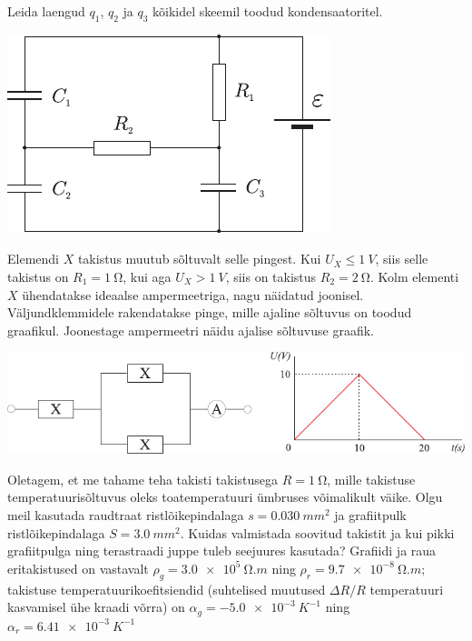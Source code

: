 \documentclass[10pt, twoside]{article}
\begin{document}
{
Leida laengud $q_1$, $q_2$ ja $q_3$ kõikidel skeemil toodud kondensaatoritel.

\begin{center}
	\includegraphics[width=0.7\linewidth]{2006-lahg-02-yl}
\end{center}
\probend
\bigskip


Elemendi $X$ takistus muutub sõltuvalt selle pingest. Kui $U_X \leq \SI{1}{V}$,
siis selle takistus on $R_1 = \SI{1}{\ohm}$, kui aga $U_X > \SI{1}{V}$, siis on takistus $R_2 =
\SI{2}{\ohm}$. Kolm elementi $X$ ühendatakse ideaalse ampermeetriga, nagu näidatud joonisel.
Väljundklemmidele rakendatakse pinge, mille ajaline sõltuvus on toodud graafikul.
Joonestage ampermeetri näidu ajalise sõltuvuse graafik.

\begin{center}
	\includegraphics[width=\linewidth]{2009-lahg-03-yl}
\end{center}
\probend
\bigskip


Oletagem, et me tahame teha takisti takistusega $R = \SI{1}{\ohm}$, mille takistuse temperatuurisõltuvus oleks toatemperatuuri ümbruses võimalikult väike. Olgu meil kasutada raudtraat ristlõikepindalaga $s = \SI{0,030}{mm^2}$ ja grafiitpulk ristlõikepindalaga $S = \SI{3,0}{mm^2}$. Kuidas valmistada soovitud takistit ja kui pikki grafiitpulga ning terastraadi juppe tuleb seejuures kasutada? Grafiidi ja raua eritakistused on vastavalt $\rho_g = \SI{3,0e5}{\ohm.m}$ ning $\rho_r = \SI{9,7e-8}{\ohm.m}$; takistuse temperatuurikoefitsiendid (suhtelised muutused $\Delta R/R$ temperatuuri kasvamisel ühe kraadi võrra) on $\alpha_g = \SI{-5,0e-3}{K^{-1}}$ ning $\alpha_r = \SI{6,41e-3}{K^{-1}}$
\probend
\bigskip

}
\end{document}
